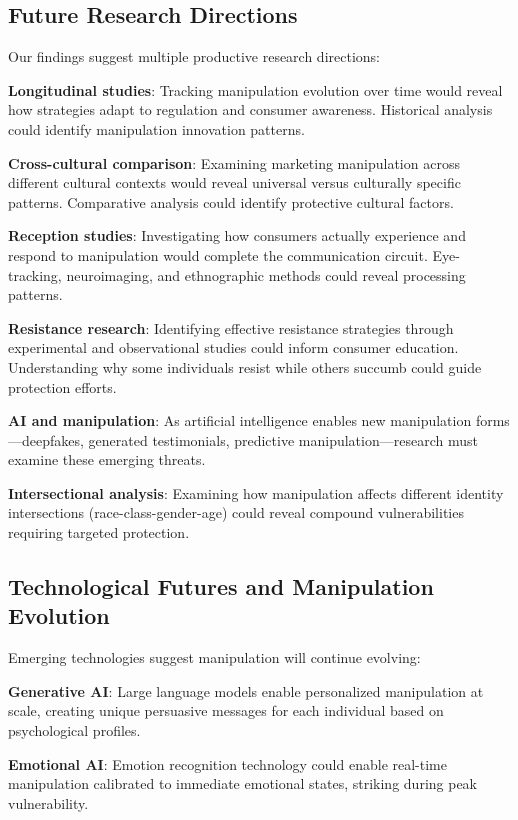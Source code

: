 \subsection{Future Research Directions}

Our findings suggest multiple productive research directions:

\textbf{Longitudinal studies}: Tracking manipulation evolution over time would reveal how strategies adapt to regulation and consumer awareness. Historical analysis could identify manipulation innovation patterns.

\textbf{Cross-cultural comparison}: Examining marketing manipulation across different cultural contexts would reveal universal versus culturally specific patterns. Comparative analysis could identify protective cultural factors.

\textbf{Reception studies}: Investigating how consumers actually experience and respond to manipulation would complete the communication circuit. Eye-tracking, neuroimaging, and ethnographic methods could reveal processing patterns.

\textbf{Resistance research}: Identifying effective resistance strategies through experimental and observational studies could inform consumer education. Understanding why some individuals resist while others succumb could guide protection efforts.

\textbf{AI and manipulation}: As artificial intelligence enables new manipulation forms—deepfakes, generated testimonials, predictive manipulation—research must examine these emerging threats.

\textbf{Intersectional analysis}: Examining how manipulation affects different identity intersections (race-class-gender-age) could reveal compound vulnerabilities requiring targeted protection.

\subsection{Technological Futures and Manipulation Evolution}

Emerging technologies suggest manipulation will continue evolving:

\textbf{Generative AI}: Large language models enable personalized manipulation at scale, creating unique persuasive messages for each individual based on psychological profiles.

\textbf{Emotional AI}: Emotion recognition technology could enable real-time manipulation calibrated to immediate emotional states, striking during peak vulnerability.

